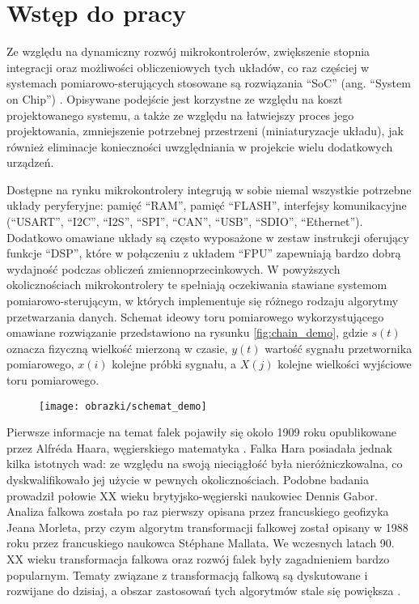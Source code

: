 \chapter{Wstęp do pracy}

Ze względu na dynamiczny rozwój mikrokontrolerów, zwiększenie stopnia integracji oraz możliwości obliczeniowych tych układów, co raz częściej w systemach pomiarowo-sterujących stosowane są rozwiązania \enquote{SoC} (ang. \enquote{System on Chip}) \cite{saleh_systemonchip}. Opisywane podejście jest korzystne ze względu na koszt projektowanego systemu, a także ze względu na łatwiejszy proces jego projektowania, zmniejszenie potrzebnej przestrzeni (miniaturyzacje układu), jak również eliminacje konieczności uwzględniania w projekcie wielu dodatkowych urządzeń.

Dostępne na rynku mikrokontrolery integrują w sobie niemal wszystkie potrzebne układy peryferyjne: pamięć \enquote{RAM}, pamięć \enquote{FLASH}, interfejsy komunikacyjne (\enquote{USART}, \enquote{I2C}, \enquote{I2S}, \enquote{SPI}, \enquote{CAN}, \enquote{USB}, \enquote{SDIO}, \enquote{Ethernet}). Dodatkowo omawiane układy są często wyposażone w zestaw instrukcji oferujący funkcje \enquote{DSP}, które w połączeniu z układem \enquote{FPU} zapewniają bardzo dobrą wydajność podczas obliczeń zmiennoprzecinkowych. W powyższych okolicznościach mikrokontrolery te spełniają oczekiwania stawiane systemom pomiarowo-sterującym, w których implementuje się różnego rodzaju algorytmy przetwarzania danych. Schemat ideowy toru pomiarowego wykorzystującego omawiane rozwiązanie przedstawiono na rysunku \ref{fig:chain_demo}, gdzie $s(t)$ oznacza fizyczną wielkość mierzoną w czasie, $y(t)$ wartość sygnału przetwornika pomiarowego, $x(i)$ kolejne próbki sygnału, a $X(j)$ kolejne wielkości wyjściowe toru pomiarowego.

\begin{figure}[htb!]
\begin{center}
\texttt{[image: obrazki/schemat\_demo]}
\end{center}
\end{figure}

Pierwsze informacje na temat falek pojawiły się około 1909 roku opublikowane przez Alfréda Haara, węgierskiego matematyka \cite{haar_basics}. Falka Hara posiadała jednak kilka istotnych wad: ze względu na swoją nieciągłość była nieróżniczkowalna, co dyskwalifikowało jej użycie w pewnych okolicznościach. Podobne badania prowadził połowie XX wieku brytyjsko-węgierski naukowiec Dennis Gabor. Analiza falkowa została po raz pierwszy opisana przez francuskiego geofizyka Jeana Morleta, przy czym algorytm transformacji falkowej został opisany w 1988 roku przez francuskiego naukowca Stéphane Mallata. We wczesnych latach 90. XX wieku transformacja falkowa oraz rozwój falek były zagadnieniem bardzo popularnym. Tematy związane z transformacją falkową są dyskutowane i rozwijane do dzisiaj, a obszar zastosowań tych algorytmów stale się powiększa \cite{akujuobi_applications}.

